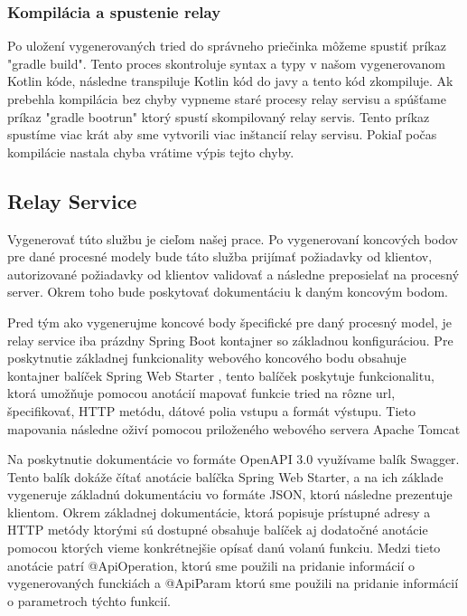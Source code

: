 \subsubsection{Kompilácia a spustenie relay}

Po uložení vygenerovaných tried do správneho priečinka môžeme spustiť príkaz "gradle build". Tento proces skontroluje syntax a typy v našom vygenerovanom Kotlin kóde, následne transpiluje Kotlin kód do javy a tento kód zkompiluje. Ak prebehla kompilácia bez chyby vypneme staré procesy relay servisu a spúšťame príkaz "gradle bootrun" ktorý spustí skompilovaný relay servis. Tento príkaz spustíme viac krát aby sme vytvorili viac inštancií relay servisu. Pokiaľ počas kompilácie nastala chyba vrátime výpis tejto chyby.

\subsection{Relay Service}

Vygenerovať túto službu je cieľom našej prace. Po vygenerovaní koncových bodov pre dané procesné modely bude táto služba prijímať požiadavky od klientov, autorizované požiadavky od klientov validovať a následne preposielať na procesný server. Okrem toho bude poskytovať dokumentáciu k daným koncovým bodom.

Pred tým ako vygenerujme koncové body špecifické pre daný procesný model, je relay service iba prázdny Spring Boot kontajner so základnou konfiguráciou. Pre poskytnutie základnej funkcionality webového koncového bodu obsahuje kontajner balíček Spring Web Starter \cite{webstarter}, tento balíček poskytuje funkcionalitu, ktorá umožňuje pomocou anotácií mapovať funkcie tried na rôzne \acrshort{url}, špecifikovať, HTTP metódu, dátové polia vstupu a formát výstupu. Tieto mapovania následne oživí pomocou priloženého webového servera Apache Tomcat \cite{tomcat}

Na poskytnutie dokumentácie vo formáte OpenAPI 3.0 \cite{openapi} využívame balík Swagger. Tento balík dokáže čítať anotácie balíčka Spring Web Starter, a na ich základe vygeneruje základnú dokumentáciu vo formáte JSON, ktorú následne prezentuje klientom. Okrem základnej dokumentácie, ktorá popisuje prístupné adresy a HTTP metódy ktorými sú dostupné obsahuje balíček aj dodatočné anotácie pomocou ktorých vieme konkrétnejšie opísať danú volanú funkciu. Medzi tieto anotácie patrí @ApiOperation, ktorú sme použili na pridanie informácií o vygenerovaných funckiách a @ApiParam ktorú sme použili na pridanie informácií o parametroch týchto funkcií.

